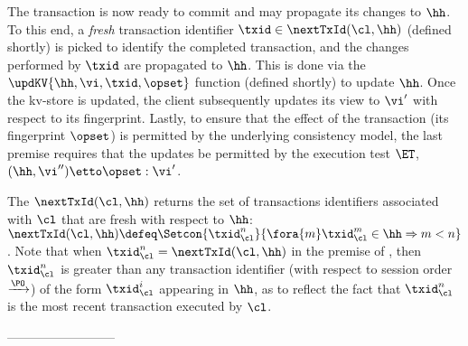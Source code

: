 The transaction is now ready to commit and may propagate its changes to $\hh$.
To this end, a \emph{fresh} transaction identifier $\txid \in \nextTxId(\cl, \hh)$ (defined shortly) is picked
to identify the completed transaction, and the changes performed by $\txid$ are propagated to $\hh$. 
This is done via the $\updKV{\hh, \vi, \txid, \opset}$ function (defined shortly) to update $\hh$. 
Once the kv-store is updated, the client subsequently updates its view to $\vi'$ with respect to its fingerprint. 
Lastly, to ensure that the effect of the transaction (its fingerprint  $\opset$) is permitted by the underlying consistency model, 
the last premise requires that the updates be permitted by the execution test $\ET$, \ie \( (\hh, \vi'') \etto \opset : \vi'\).

The $\nextTxId(\cl, \hh)$ returns the set of transactions identifiers associated with $\cl$ that are fresh with respect to $\hh$: 
$\nextTxId(\cl, \hh) \defeq \Setcon{\txid_{\cl}^{n}}{\fora{m} \txid_{\cl}^{m} \in \hh \Rightarrow m < n }$.
Note that when $\txid_\cl^n = \nextTxId(\cl, \hh)$ in the premise of , then $\txid_\cl^n$ is greater than any transaction identifier 
(with respect to session order $\xrightarrow{\PO}$) 
of the form $\txid_{\cl}^{i}$ appearing in $\hh$,
as to reflect the fact that $\txid_\cl^n$ is the most recent transaction executed by $\cl$.


--------------------------

